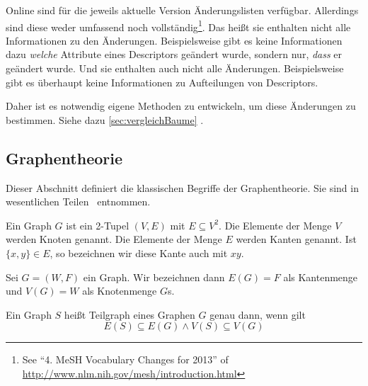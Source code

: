 Online sind für die jeweils aktuelle Version Änderungslisten verfügbar. Allerdings sind diese weder umfassend noch vollständig\footnote{See "`4. MeSH Vocabulary Changes for 2013"' of \url{http://www.nlm.nih.gov/mesh/introduction.html}}. Das heißt sie enthalten nicht alle Informationen zu den Änderungen. Beispielsweise gibt es keine Informationen dazu \textit{welche} Attribute eines Descriptors geändert wurde, sondern nur, \textit{dass} er geändert wurde. Und sie enthalten auch nicht alle Änderungen. Beispielsweise gibt es überhaupt keine Informationen zu Aufteilungen von Descriptors. \par

Daher ist es notwendig eigene Methoden zu entwickeln, um diese Änderungen zu bestimmen. Siehe dazu \autoref{sec:vergleichBaume} \textit{}. 

\subsection{Graphentheorie}
Dieser Abschnitt definiert die klassischen Begriffe der Graphentheorie. Sie sind in wesentlichen Teilen~\cite{Diestel2010} entnommen.

\begin{definition}[Graph, Knoten, Kante]
Ein Graph $G$ ist ein 2-Tupel $(V,E)$ mit $E \subseteq V^2$. Die Elemente der Menge $V$ werden Knoten genannt. Die Elemente der Menge $E$ werden Kanten genannt. Ist $\{x,y\} \in E$, so bezeichnen wir diese Kante auch mit $xy$.
\end{definition}

\begin{definition}
Sei $G=(W,F)$ ein Graph. Wir bezeichnen dann $E(G) = F$ als Kantenmenge und $V(G) = W$ als Knotenmenge $G$s.
\end{definition}

\begin{definition}[Teilgraph]
Ein Graph $S$ heißt Teilgraph eines Graphen $G$ genau dann, wenn gilt
\[ 
 E(S) \subseteq E(G) \wedge V(S) \subseteq V(G)
\]
\end{definition}

